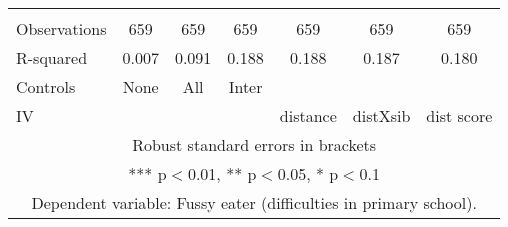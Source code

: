 \begin{tabular}{lcccccc}
 &  &  &  &  &  &  \\
Observations & 659 & 659 & 659 & 659 & 659 & 659 \\
R-squared & 0.007 & 0.091 & 0.188 & 0.188 & 0.187 & 0.180 \\
Controls & None & All & Inter &  &  &  \\
 IV &  &  &  & distance & distXsib & dist score \\ \hline
\multicolumn{7}{c}{ Robust standard errors in brackets} \\
\multicolumn{7}{c}{ *** p$<$0.01, ** p$<$0.05, * p$<$0.1} \\
\multicolumn{7}{c}{ Dependent variable: Fussy eater (difficulties in primary school).} \\
\end{tabular}
